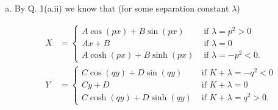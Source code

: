 \documentclass[12pt]{article}
\begin{document}
\begin{answer}
\begin{enumerate}[(a)]
\item By Q. 1(a.ii) we know that (for some separation constant $\lambda$)

\begin{align*}
X&=\begin{cases}
A\cos(px)+B\sin(px)&\mbox{ if }\lambda=p^2>0\\
Ax+B&\mbox{ if }\lambda=0\\
A\cosh(px)+B\sinh(px)&\mbox{ if }\lambda=-p^2<0.
\end{cases}\\
Y&=\begin{cases}
C\cos(qy)+D\sin(qy)&\mbox{ if }K+\lambda=-q^2<0\\
Cy+D&\mbox{ if }K+\lambda=0\\
C\cosh(qy)+D\sinh(qy)&\mbox{ if }K+\lambda=q^2>0.
\end{cases}
\end{align*}


\end{enumerate}
\end{answer}
\end{document}
